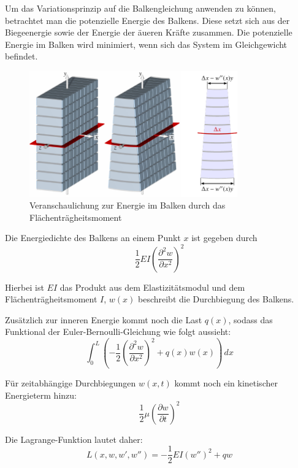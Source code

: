Um das Variationsprinzip auf die Balkengleichung anwenden zu können, betrachtet man die potenzielle Energie des Balkens. Diese setzt sich aus der Biegeenergie sowie der Energie der äueren Kräfte zusammen. Die potenzielle Energie im Balken wird minimiert, wenn sich das System im Gleichgewicht befindet.
\begin{figure} [h]
	\centering
	\includegraphics[width=0.8\textwidth]{papers/balken/images/teil2/federgesetz.pdf}
	\caption{Veranschaulichung zur Energie im Balken durch das Flächenträgheitsmoment}
	\label{fig:Veranschaulichung zur Energie im Balken durch das Flächenträgheitsmoment}
\end{figure}

Die Energiedichte des Balkens an einem Punkt $x$ ist gegeben durch
\begin{equation}
	\frac{1}{2} E I \left( \frac{\partial^2 w}{\partial x^2} \right)^2
\end{equation}

Hierbei ist $E I$ das Produkt aus dem Elastizitätsmodul und dem Flächenträgheitsmoment $I$, $w(x)$ beschreibt die Durchbiegung des Balkens.

Zusätzlich zur inneren Energie kommt noch die Last $q(x)$, sodass das Funktional der Euler-Bernoulli-Gleichung wie folgt aussieht:
\begin{equation}
	\int_0^L \left( -\frac{1}{2} \left( \frac{\partial^2 w}{\partial x^2} \right)^2 + q(x) w(x) \right) \, dx
\end{equation}

Für zeitabhängige Durchbiegungen $w(x,t)$ kommt noch ein kinetischer Energieterm hinzu:
\begin{equation}
	\frac{1}{2} \mu \left( \frac{\partial w}{\partial t} \right)^2
\end{equation}

Die Lagrange-Funktion lautet daher:
\begin{equation}
	L(x,w,w',w'') = -\frac{1}{2} E I (w'')^2 + q w
\end{equation}

